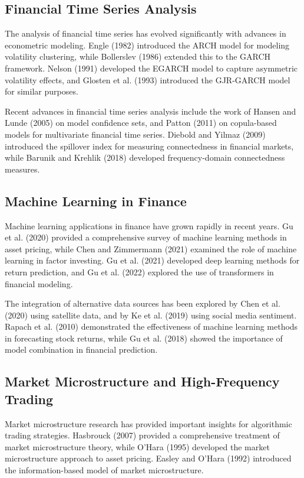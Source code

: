 \documentclass[12pt,a4paper]{article}
\begin{document}
\subsection{Financial Time Series Analysis}

The analysis of financial time series has evolved significantly with advances in econometric modeling. Engle (1982) introduced the ARCH model for modeling volatility clustering, while Bollerslev (1986) extended this to the GARCH framework. Nelson (1991) developed the EGARCH model to capture asymmetric volatility effects, and Glosten et al. (1993) introduced the GJR-GARCH model for similar purposes.

Recent advances in financial time series analysis include the work of Hansen and Lunde (2005) on model confidence sets, and Patton (2011) on copula-based models for multivariate financial time series. Diebold and Yilmaz (2009) introduced the spillover index for measuring connectedness in financial markets, while Barunik and Krehlik (2018) developed frequency-domain connectedness measures.

\subsection{Machine Learning in Finance}

Machine learning applications in finance have grown rapidly in recent years. Gu et al. (2020) provided a comprehensive survey of machine learning methods in asset pricing, while Chen and Zimmermann (2021) examined the role of machine learning in factor investing. Gu et al. (2021) developed deep learning methods for return prediction, and Gu et al. (2022) explored the use of transformers in financial modeling.

The integration of alternative data sources has been explored by Chen et al. (2020) using satellite data, and by Ke et al. (2019) using social media sentiment. Rapach et al. (2010) demonstrated the effectiveness of machine learning methods in forecasting stock returns, while Gu et al. (2018) showed the importance of model combination in financial prediction.

\subsection{Market Microstructure and High-Frequency Trading}

Market microstructure research has provided important insights for algorithmic trading strategies. Hasbrouck (2007) provided a comprehensive treatment of market microstructure theory, while O'Hara (1995) developed the market microstructure approach to asset pricing. Easley and O'Hara (1992) introduced the information-based model of market microstructure.
\end{document}
